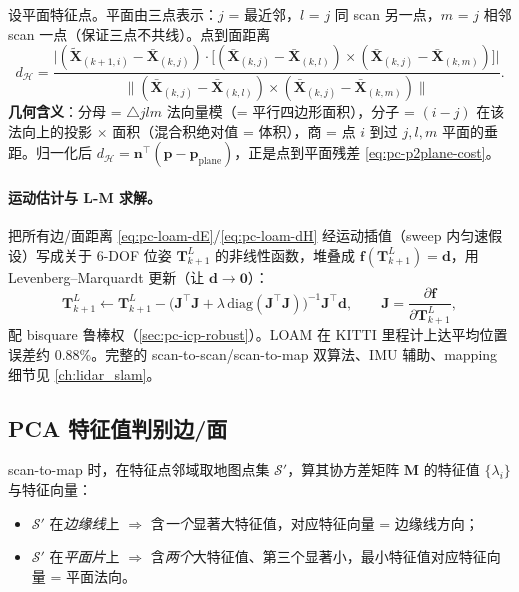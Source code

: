 \begin{derivation}[点到平面片距离]
设平面特征点。平面由三点表示：$j$ = 最近邻，$l$ = $j$ 同 scan 另一点，$m$ = $j$ 相邻 scan 一点（保证三点不共线）。点到面距离
\begin{equation}
  d_{\mathcal{H}}=\frac{\Big|(\tilde{\mathbf{X}}_{(k+1,i)}-\bar{\mathbf{X}}_{(k,j)})\cdot\big[(\bar{\mathbf{X}}_{(k,j)}-\bar{\mathbf{X}}_{(k,l)})\times(\bar{\mathbf{X}}_{(k,j)}-\bar{\mathbf{X}}_{(k,m)})\big]\Big|}{\big\|(\bar{\mathbf{X}}_{(k,j)}-\bar{\mathbf{X}}_{(k,l)})\times(\bar{\mathbf{X}}_{(k,j)}-\bar{\mathbf{X}}_{(k,m)})\big\|}.
  \label{eq:pc-loam-dH}
\end{equation}
\textbf{几何含义}：分母 = $\triangle jlm$ 法向量模（= 平行四边形面积），分子 = $(i-j)$ 在该法向上的投影 $\times$ 面积（混合积绝对值 = 体积），商 = 点 $i$ 到过 $j,l,m$ 平面的垂距。归一化后 $d_{\mathcal{H}}=\mathbf{n}^\top(\mathbf{p}-\mathbf{p}_{\text{plane}})$，正是点到平面残差 \cref{eq:pc-p2plane-cost}。
\end{derivation}

\paragraph{运动估计与 L-M 求解。}
把所有边/面距离 \cref{eq:pc-loam-dE}/\cref{eq:pc-loam-dH} 经运动插值（sweep 内匀速假设）写成关于 $6$-DOF 位姿 $\mathbf{T}^L_{k+1}$ 的非线性函数，堆叠成 $\mathbf{f}(\mathbf{T}^L_{k+1})=\mathbf{d}$，用 Levenberg--Marquardt 更新（让 $\mathbf{d}\to\mathbf{0}$）：
\begin{equation}
  \mathbf{T}^L_{k+1}\leftarrow\mathbf{T}^L_{k+1}-\big(\mathbf{J}^\top\mathbf{J}+\lambda\,\mathrm{diag}(\mathbf{J}^\top\mathbf{J})\big)^{-1}\mathbf{J}^\top\mathbf{d},\qquad \mathbf{J}=\frac{\partial\mathbf{f}}{\partial\mathbf{T}^L_{k+1}},
  \label{eq:pc-loam-lm}
\end{equation}
配 bisquare 鲁棒权（\cref{sec:pc-icp-robust}）。LOAM 在 KITTI 里程计上达平均位置误差约 $0.88\%$\cite{zhang2014loam}。完整的 scan-to-scan/scan-to-map 双算法、IMU 辅助、mapping 细节见 \cref{ch:lidar_slam}。

\subsection{PCA 特征值判别边/面}
\label{sec:pc-loam-pca}

scan-to-map 时，在特征点邻域取地图点集 $\mathcal{S}'$，算其协方差矩阵 $\mathbf{M}$ 的特征值 $\{\lambda_i\}$ 与特征向量：
\begin{itemize}
  \item $\mathcal{S}'$ 在\emph{边缘线}上 $\Rightarrow$ 含\emph{一个}显著大特征值，对应特征向量 = 边缘线方向；
  \item $\mathcal{S}'$ 在\emph{平面片}上 $\Rightarrow$ 含\emph{两个}大特征值、第三个显著小，最小特征值对应特征向量 = 平面法向。
\end{itemize}

